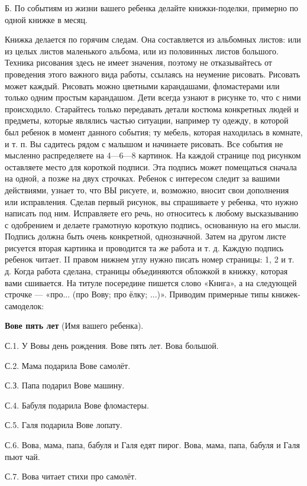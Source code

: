 \documentclass[a5paper]{book}
\begin{document}
Б. По событиям из жизни вашего ребенка делайте книжки-поделки, примерно
по одной книжке в месяц.

Книжка делается по горячим следам. Она составляется из альбомных листов:
или из целых листов маленького альбома, или из половинных листов
большого. Техника рисования здесь не имеет значения, поэтому не
отказывайтесь от проведения этого важного вида работы, ссылаясь на
неумение рисовать. Рисовать может каждый. Рисовать можно цветными
карандашами, фломастерами или только одним простым карандашом. Дети
всегда узнают в рисунке то, что с ними происходило. Старайтесь только
передавать детали костюма конкретных людей и предметы, которые являлись
частью ситуации, например ту одежду, в которой был ребенок в момент
данного события; ту мебель, которая находилась в комнате, и т. п. Вы
садитесь рядом с малышом и начинаете рисовать. Все события не мысленно
распределяете на 4---6---8 картинок. На каждой странице под рисунком
оставляете место для короткой подписи. Эта подпись может помещаться
сначала на одной, а позже на двух строчках. Ребенок с интересом следит
за вашими действиями, узнает то, что ВЫ рисуете, и, возможно, вносит
свои дополнения или исправления. Сделав первый рисунок, вы спрашиваете у
ребенка, что нужно написать под ним. Исправляете его речь, но относитесь
к любому высказыванию с одобрением и делаете грамотную короткую подпись,
основанную на его мысли. Подпись должна быть очень конкретной,
однозначной. Затем на другом листе рисуется вторая картинка и проводится
та же работа и т. д. Каждую подпись ребенок читает. II правом нижнем
углу нужно писать номер страницы: 1, 2 и т. д. Когда работа сделана,
страницы объединяются обложкой в книжку, которая вами сшивается. На
титуле посередине пишется слово «Книга», а на следующей строчке ---
«про... (про Вову; про ёлку; ...)». Приводим примерные типы
книжек-самоделок:

\textbf{Вове пять лет} (Имя вашего ребенка).

С.1. У Вовы день рождения. Вове пять лет. Вова большой.

С.2. Мама подарила Вове самолёт.

С.З. Папа подарил Вове машину.

С.4. Бабуля подарила Вове фломастеры.

С.5. Галя подарила Вове лопату.

С.6. Вова, мама, папа, бабуля и Галя едят пирог. Вова, мама, папа,
бабуля и Галя пьют чай.

С.7. Вова читает стихи про самолёт.
\end{document}
